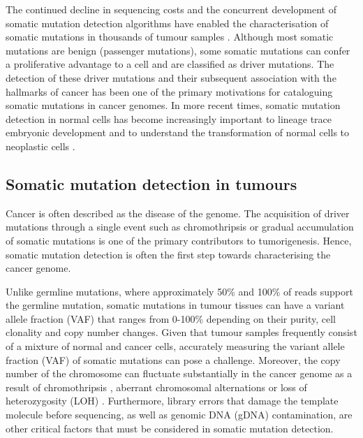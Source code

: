 The continued decline in sequencing costs and the concurrent development of somatic mutation detection algorithms have enabled the characterisation of somatic mutations in thousands of tumour samples \cite{Weinstein2013-ko, ICGCTCGA_Pan-Cancer_Analysis_of_Whole_Genomes_Consortium2020-ts}. Although most somatic mutations are benign (passenger mutations), some somatic mutations can confer a proliferative advantage to a cell and are classified as driver mutations. The detection of these driver mutations and their subsequent association with the hallmarks of cancer \cite{Hanahan2000-dp, Hanahan2011-zr} has been one of the primary motivations for cataloguing somatic mutations in cancer genomes. In more recent times, somatic mutation detection in normal cells has become increasingly important to lineage trace embryonic development \cite{Behjati2014-gb} and to understand the transformation of normal cells to neoplastic cells \cite{Martincorena2015-io}. 

\subsection{Somatic mutation detection in tumours}
\label{sec:somatic_mutation_detection_in_tumours}

Cancer is often described as the disease of the genome. The acquisition of driver mutations through a single event such as chromothripsis \cite{Stephens2011-gj} or gradual accumulation of somatic mutations \cite{Doll1954-of, Knudson1971-fg} is one of the primary contributors to tumorigenesis. Hence, somatic mutation detection is often the first step towards characterising the cancer genome. 

Unlike germline mutations, where approximately 50\% and 100\% of reads support the germline mutation, somatic mutations in tumour tissues can have a variant allele fraction (VAF) that ranges from 0-100\% depending on their purity, cell clonality and copy number changes. Given that tumour samples frequently consist of a mixture of normal and cancer cells, accurately measuring the variant allele fraction (VAF) of somatic mutations can pose a challenge. Moreover, the copy number of the chromosome can fluctuate substantially in the cancer genome as a result of chromothripsis \cite{Stephens2011-gj}, aberrant chromosomal alternations \cite{Albertson2003-lr, Frohling2008-uc} or loss of heterozygosity (LOH) \cite{Lasko1991-wq}. Furthermore, library errors that damage the template molecule before sequencing, as well as genomic DNA (gDNA) contamination, are other critical factors that must be considered in somatic mutation detection.

